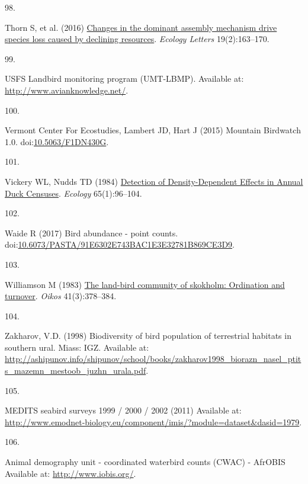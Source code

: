 \documentclass{article}
\newlength{\cslhangindent}
\newlength{\csllabelwidth}
\newlength{\cslentryspacingunit} %
\newenvironment{CSLReferences}[2] %
 {%
  \setlength{\parindent}{0pt}
  \ifodd #1
  \let\oldpar\par
  \def\par{\hangindent=\cslhangindent\oldpar}
  \fi
  \setlength{\parskip}{#2\cslentryspacingunit}
 }%
 {}
\newcommand{\CSLLeftMargin}[1]{\parbox[t]{\csllabelwidth}{#1}}
\newcommand{\CSLRightInline}[1]{\parbox[t]{\linewidth - \csllabelwidth}{#1}\break}
\begin{document}
\begin{CSLReferences}{0}{0}
\leavevmode{}%
\CSLLeftMargin{98. }%
\CSLRightInline{Thorn S, et al. (2016)
\href{https://doi.org/10.1111/ele.12548}{Changes in the dominant
assembly mechanism drive species loss caused by declining resources}.
\emph{Ecology Letters} 19(2):163--170.}

\leavevmode{}%
\CSLLeftMargin{99. }%
\CSLRightInline{USFS Landbird monitoring program (UMT-LBMP). Available
at: \url{http://www.avianknowledge.net/}.}

\leavevmode{}%
\CSLLeftMargin{100. }%
\CSLRightInline{Vermont Center For Ecostudies, Lambert JD, Hart J (2015)
Mountain Birdwatch 1.0.
doi:\href{https://doi.org/10.5063/F1DN430G}{10.5063/F1DN430G}.}

\leavevmode{}%
\CSLLeftMargin{101. }%
\CSLRightInline{Vickery WL, Nudds TD (1984)
\href{https://doi.org/10.2307/1939462}{Detection of Density-Dependent
Effects in Annual Duck Censuses}. \emph{Ecology} 65(1):96--104.}

\leavevmode{}%
\CSLLeftMargin{102. }%
\CSLRightInline{Waide R (2017) Bird abundance - point counts.
doi:\href{https://doi.org/10.6073/PASTA/91E6302E743BAC1E3E32781B869CE3D9}{10.6073/PASTA/91E6302E743BAC1E3E32781B869CE3D9}.}

\leavevmode{}%
\CSLLeftMargin{103. }%
\CSLRightInline{Williamson M (1983)
\href{https://doi.org/10.2307/3544096}{The land-bird community of
skokholm: Ordination and turnover}. \emph{Oikos} 41(3):378--384.}

\leavevmode{}%
\CSLLeftMargin{104. }%
\CSLRightInline{Zakharov, V.D. (1998) Biodiversity of bird population of
terrestrial habitats in southern ural. Miass: IGZ. Available at:
\url{http://ashipunov.info/shipunov/school/books/zakharov1998_biorazn_nasel_ptits_mazemn_mestoob_juzhn_urala.pdf}.}

\leavevmode{}%
\CSLLeftMargin{105. }%
\CSLRightInline{MEDITS seabird surveys 1999 / 2000 / 2002 (2011)
Available at:
\url{http://www.emodnet-biology.eu/component/imis/?module=dataset\&dasid=1979}.}

\leavevmode{}%
\CSLLeftMargin{106. }%
\CSLRightInline{Animal demography unit - coordinated waterbird counts
(CWAC) - AfrOBIS Available at: \url{http://www.iobis.org/}.}


\end{CSLReferences}
\end{document}
